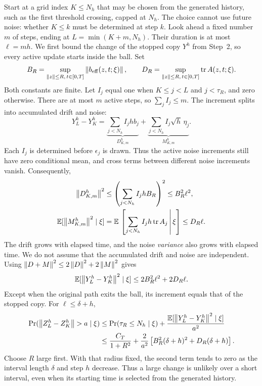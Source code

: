 Start at a grid index $K\leq N_h$ that may be chosen from the generated history, such as the first threshold crossing, capped at $N_h$. The choice cannot use future noise: whether $K\leq k$ must be determined at step $k$. Look ahead a fixed number $m$ of steps, ending at $L=\min(K+m,N_h)$. Their duration is at most $\ell=mh$. We first bound the change of the stopped copy $Y^h$ from Step~2, so every active update starts inside the ball. Set
\[
 B_R=\sup_{\left\lVert z\right\rVert\leq R,\,t\in[0,T]}\left\lVert b_{\mathrm{eff}}(z,t;\xi)\right\rVert,
 \qquad
 D_R=\sup_{\left\lVert z\right\rVert\leq R,\,t\in[0,T]}\operatorname{tr}A(z,t;\xi).
\]
Both constants are finite. Let $I_j$ equal one when $K\leq j<L$ and $j<\tau_R$, and zero otherwise. There are at most $m$ active steps, so $\sum_j I_j\leq m$. The increment splits into accumulated drift and noise:
\begin{equation}\label{eq:interval-decomposition}
 Y_L^h-Y_K^h
 =\underbrace{\sum_{j<N_h}I_j h b_j}_{D_{K,m}^h}
  +\underbrace{\sum_{j<N_h}I_j\sqrt h\,\eta_j}_{M_{K,m}^h}.
\end{equation}
Each $I_j$ is determined before $\epsilon_j$ is drawn. Thus the active noise increments still have zero conditional mean, and cross terms between different noise increments vanish. Consequently,
\begin{align}\label{eq:interval-components}
 \left\lVert D_{K,m}^h\right\rVert^2
 &\leq\left(\sum_{j<N_h}I_jh B_R\right)^2
 \leq B_R^2\ell^2,\notag\\
 \mathbb E[\left\lVert M_{K,m}^h\right\rVert^2\mid\xi]
 &=\mathbb E\,\left[\sum_{j<N_h}I_jh\operatorname{tr}A_j\,\middle|\,\xi\right]
 \leq D_R\ell.
\end{align}
The drift grows with elapsed time, and the noise \emph{variance} also grows with elapsed time. We do not assume that the accumulated drift and noise are independent. Using $\left\lVert D+M\right\rVert^2\leq2\left\lVert D\right\rVert^2+2\left\lVert M\right\rVert^2$ gives
\begin{equation}\label{eq:short-increment}
 \mathbb E[\left\lVert Y_L^h-Y_K^h\right\rVert^2\mid\xi]
 \leq2B_R^2\ell^2+2D_R\ell.
\end{equation}
Except when the original path exits the ball, its increment equals that of the stopped copy. For $\ell\leq\delta+h$,
\begin{align}\label{eq:short-increment-probability}
 \Pr(\left\lVert Z_L^h-Z_K^h\right\rVert>a\mid\xi)
 &\leq\Pr(\tau_R\leq N_h\mid\xi)
    +\frac{\mathbb E[\left\lVert Y_L^h-Y_K^h\right\rVert^2\mid\xi]}{a^2}\notag\\
 &\leq\frac{C_T}{1+R^2}
   +\frac{2}{a^2}\left[B_R^2(\delta+h)^2+D_R(\delta+h)\right].
\end{align}
Choose $R$ large first. With that radius fixed, the second term tends to zero as the interval length $\delta$ and step $h$ decrease. Thus a large change is unlikely over a short interval, even when its starting time is selected from the generated history.

